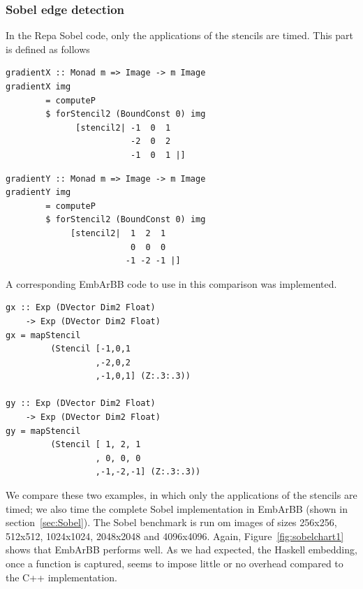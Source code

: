 \subsubsection{Sobel edge detection}
In the Repa Sobel code, only the applications of the stencils are timed. This 
part is defined as follows 
\begin{Verbatim}[samepage=true]
gradientX :: Monad m => Image -> m Image
gradientX img
        = computeP
        $ forStencil2 (BoundConst 0) img
              [stencil2| -1  0  1
                         -2  0  2
                         -1  0  1 |]
\end{Verbatim}
\begin{Verbatim}[samepage=true]
gradientY :: Monad m => Image -> m Image
gradientY img
        = computeP
        $ forStencil2 (BoundConst 0) img
             [stencil2|  1  2  1
                         0  0  0
                        -1 -2 -1 |] 
\end{Verbatim}

A corresponding EmbArBB code to use in this comparison was implemented.




\begin{verbatim} 
gx :: Exp (DVector Dim2 Float) 
    -> Exp (DVector Dim2 Float)  
gx = mapStencil 
         (Stencil [-1,0,1
                  ,-2,0,2
                  ,-1,0,1] (Z:.3:.3)) 

gy :: Exp (DVector Dim2 Float) 
    -> Exp (DVector Dim2 Float) 
gy = mapStencil 
         (Stencil [ 1, 2, 1
                  , 0, 0, 0
                  ,-1,-2,-1] (Z:.3:.3))
\end{verbatim}


We compare these two examples, in which only the applications of the stencils
are timed; we also time the complete Sobel implementation in EmbArBB (shown
in section~\ref{sec:Sobel}).
The Sobel benchmark is run om images of sizes 256x256, 512x512, 1024x1024, 2048x2048 and 4096x4096.
Again, Figure~\ref{fig:sobelchart1} shows that EmbArBB performs well.  As we had expected, the 
Haskell embedding, once a function is captured, seems to impose little or no overhead 
compared to the C++ implementation.

